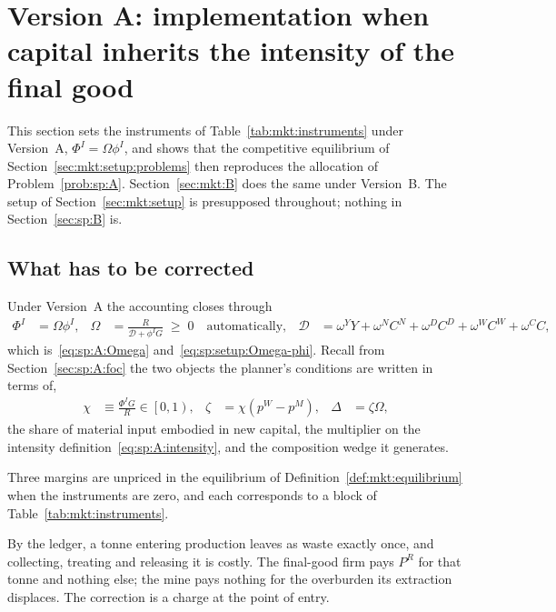 ﻿\section{Version A: implementation when capital inherits the intensity of the final good}\label{sec:mkt:A}

This section sets the instruments of Table~\ref{tab:mkt:instruments} under Version~A,
$\Phi^I=\Omega\phi^I$, and shows that the competitive equilibrium of
Section~\ref{sec:mkt:setup:problems} then reproduces the allocation of Problem~\ref{prob:sp:A}.
Section~\ref{sec:mkt:B} does the same under Version~B. The setup of Section~\ref{sec:mkt:setup} is
presupposed throughout; nothing in Section~\ref{sec:sp:B} is.


\subsection{What has to be corrected}\label{sec:mkt:A:what}

Under Version~A the accounting closes through
\begin{align}
\Phi^I &= \Omega\phi^I,
&
\Omega &= \frac{R}{\mathcal D+\phi^IG}\;\ge\;0
\quad\text{automatically},
&
\mathcal D &= \omega^YY+\omega^{N}C^N+\omega^{D}C^D+\omega^WC^W+\omega^CC,
\label{eq:mkt:A:closure}
\end{align}
which is~\eqref{eq:sp:A:Omega} and~\eqref{eq:sp:setup:Omega-phi}. Recall from
Section~\ref{sec:sp:A:foc} the two objects the planner's conditions are written in terms of,
\begin{align}
\chi &\equiv \frac{\Phi^IG}{R}\in\left[0,1\right),
&
\zeta &= \chi\left(p^W-p^M\right),
&
\Delta &= \zeta\Omega,
\label{eq:mkt:A:zeta}
\end{align}
the share of material input embodied in new capital, the multiplier on the intensity
definition~\eqref{eq:sp:A:intensity}, and the composition wedge it generates.

Three margins are unpriced in the equilibrium of Definition~\ref{def:mkt:equilibrium} when the
instruments are zero, and each corresponds to a block of Table~\ref{tab:mkt:instruments}.

 By the ledger, a tonne entering production leaves as waste
exactly once, and collecting, treating and releasing it is costly. The final-good firm pays $P^R$ for
that tonne and nothing else; the mine pays nothing for the overburden its extraction displaces. The
correction is a charge at the point of entry.

